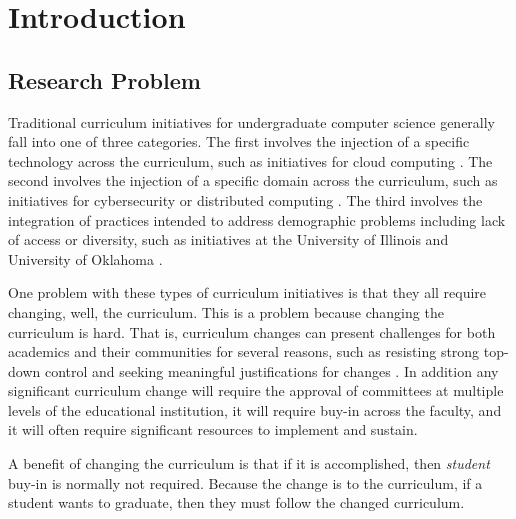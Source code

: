 \documentclass[acmsmall]{acmart}
\begin{document}


\maketitle

\section{Introduction}

\subsection{Research Problem}

Traditional curriculum initiatives for undergraduate computer science generally fall into one of three categories. The first involves the injection of a specific technology across the curriculum, such as initiatives for cloud computing \cite{deb_module-based_2019}. The second involves the injection of a specific domain across the curriculum, such as initiatives for cybersecurity \cite{tang_shaping_2019} or distributed computing \cite{abebe_watdfs:_2019}. The third involves the integration of practices intended to address demographic problems including lack of access or diversity, such as initiatives at the University of Illinois \cite{metcalf_diversity_2018} and University of Oklahoma \cite{collain_you_2019}.

One problem with these types of curriculum initiatives is that they all require changing, well, the curriculum.  This is a problem because changing the curriculum is hard. That is, curriculum changes can present challenges for both academics and their communities for several reasons, such as resisting strong top-down control and seeking meaningful justifications for changes \cite{annala_understanding_2021}. In addition any significant curriculum change will require the approval of committees at multiple levels of the educational institution, it will require buy-in across the faculty, and it will often require significant resources to implement and sustain.

A benefit of changing the curriculum is that if it is accomplished, then {\em student} buy-in is normally not required. Because the change is to the curriculum, if a student wants to graduate, then they must follow the changed curriculum.
\end{document}

